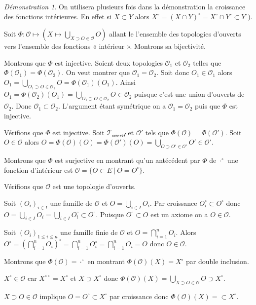 \documentclass[a4paper, 11pt, french]{book}
\newenvironment{itemise}{\itemize}{\enditemize}
\theoremstyle{plain} %
\theoremstyle{definition} %
\theoremstyle{remark} %
\newtheorem*{demonstration}{Démonstration}
\newcommand{\1}{\mathds{1}}
\newcommand{\scr}[1]{\mathscr{#1}}
\newcommand\ens[2]{\{#1 \ |\ #2\}}
\begin{document}
\begin{demonstration}
	On utilisera plusieurs fois dans la démonstration la croissance des fonctions intérieures.
	En effet si $X\subset Y$ alors $X^\circ=(X\cap Y)^\circ=X^\circ\cap Y^\circ\subset Y^\circ$).

	Soit $\Phi\colon\scr{O}\mapsto(X\mapsto\bigcup_{X\supset O\in\scr{O}}O)$ allant le l'ensemble des topologies d'ouverts vers l'ensemble des fonctions « intérieur ».
	Montrons sa bijectivité.
	\begin{itemise}
		\item Montrons que $\Phi$ est injective.
		Soient deux topologies $\scr{O}_1$ et $\scr{O}_2$ telles que $\Phi(\scr{O}_1)=\Phi(\scr{O}_2)$.
		On veut montrer que $\scr{O}_1=\scr{O}_2$.
		Soit donc $O_1\in\scr{O}_1$ alors $O_1=\bigcup_{O_1\supset O\in\scr{O}_1}O=\Phi(\scr{O}_1)(O_1)$.
		Ainsi $O_1=\Phi(\scr{O}_2)(O_1)=\bigcup_{O_1\supset O\in\scr{O}_2}O\in\scr{O}_2$ puisque c'est une union d'ouverts de $\scr{O}_2$.
		Donc $\scr{O}_1\subset\scr{O}_2$.
		L'argument étant symétrique on a $\scr{O}_1=\scr{O}_2$ puis que $\Phi$ est injective.
		\item Vérifions que $\Phi$ est injective.
		Soit $\scr{T_\text{ouvert}}$ et $\scr{O}'$ tels que $\Phi(\scr{O})=\Phi(\scr{O}')$.
		Soit $O\in\scr{O}$ alors $O=\Phi(\scr{O})(O)=\Phi(\scr{O}')(O)=\bigcup_{O\supset O'\in\scr{O}'}O'\in\scr{O}'$.
		\item Montrons que $\Phi$ est surjective en montrant qu'un antécédent par $\Phi$ de $\cdot^\circ$ une fonction d'intérieur est $\scr{O}=\ens{O\subset E}{O=O^\circ}$.
		\begin{itemise}
			\item Vérifions que $\scr{O}$ est une topologie d'ouverts.
			\begin{itemise}
				\item Soit $(O_i)_{i\in I}$ une famille de $\scr{O}$ et $O=\bigcup_{i\in I}O_i$.
				Par croissance $O_i^\circ\subset O^\circ$ donc $O=\bigcup_{i\in I}O_i=\bigcup_{i\in I}O_i^\circ\subset O^\circ$.
				Puisque $O^\circ\subset O$ est un axiome on a $O\in\scr{O}$.
				\item Soit $(O_i)_{1\leqslant i\leqslant n}$ une famille finie de $\scr{O}$ et $O=\bigcap_{i=1}^nO_i$.
				Alors $O^\circ=(\bigcap_{i=1}^nO_i)^\circ=\bigcap_{i=1}^nO_i^\circ=\bigcap_{i=1}^nO_i=O$ donc $O\in\scr{O}$.
			\end{itemise}
			\item Montrons que $\Phi(\scr{O})=\cdot^\circ$ en montrant $\Phi(\scr{O})(X)=X^\circ$ par double inclusion.
			\begin{itemise}
				\item $X^\circ\in\scr{O}$ car $X^{\circ\circ}=X^\circ$ et $X\supset X^\circ$ donc $\Phi(\scr{O})(X)=\bigcup_{X\supset O\in\scr{O}}O\supset X^\circ$.
				\item $X\supset O\in\scr{O}$ implique $O=O^\circ\subset X^\circ$ par croissance donc $\Phi(\scr{O})(X)=\subset X^\circ$.
			\end{itemise}
		\end{itemise}
	\end{itemise}
\end{demonstration}
\end{document}
